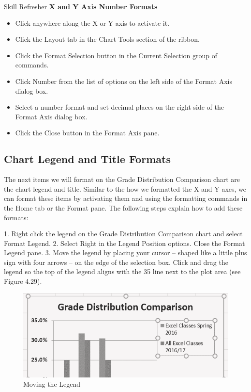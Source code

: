 \begin{center}
	\begin{sklbox}{Skill Refresher}
		\textbf{X and Y Axis Number Formats}
		\\
		\begin{itemize}
			\setlength{\itemsep}{0pt}
			\setlength{\parskip}{0pt}
			\setlength{\parsep}{0pt}

			\item Click anywhere along the X or Y axis to activate it.
			\item Click the Layout tab in the Chart Tools section of the ribbon.
			\item Click the Format Selection button in the Current Selection group of commands.
			\item Click Number from the list of options on the left side of the Format Axis dialog box.
			\item Select a number format and set decimal places on the right side of the Format Axis dialog box.
			\item Click the Close button in the Format Axis pane.
			
		\end{itemize}
	\end{sklbox}
\end{center}


\subsection{Chart Legend and Title Formats}

The next items we will format on the Grade Distribution Comparison chart are the chart legend and
title. Similar to the how we formatted the X and Y axes, we can format these items by activating them
and using the formatting commands in the Home tab or the Format pane. The following steps explain
how to add these formats:

1. Right click the legend on the Grade Distribution Comparison chart and select Format Legend.
2. Select Right in the Legend Position options. Close the Format Legend pane.
3. Move the legend by placing your cursor – shaped like a little plus sign with four arrows – on the
edge of the selection box. Click and drag the legend so the top of the legend aligns with the 35%
line next to the plot area (see Figure 4.29).



\begin{figure}[H]
	\centering
	\includegraphics[width=\maxwidth{.95\linewidth}]{gfx/ch04_fig30}
	\caption{Moving the Legend}
	\label{04:fig30}
\end{figure}





